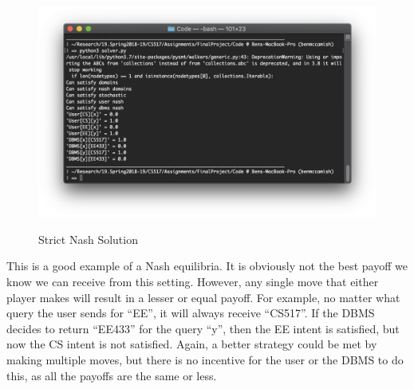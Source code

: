 \documentclass{article}
\begin{document}
\begin{figure}[h!]
\centering
\includegraphics[width=20cm]{images/nashPaper}
\label{fig:paper}
\caption{Strict Nash Solution}
\end{figure}

This is a good example of a Nash equilibria. It is obviously not the best payoff we know we can receive from this setting. However, any single move that either player makes will result in a lesser or equal payoff. For example, no matter what query the user sends for ``EE'', it will always receive ``CS517''. If the DBMS decides to return ``EE433'' for the query ``y'', then the EE intent is satisfied, but now the CS intent is not satisfied. Again, a better strategy could be met by making multiple moves, but there is no incentive for the user or the DBMS to do this, as all the payoffs are the same or less. 
\end{document}

